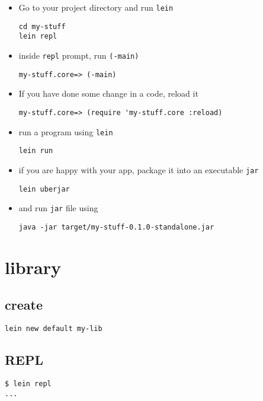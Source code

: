 \documentclass[11pt]{article}
\begin{document}
\begin{itemize}
\item Go to your project directory and run \texttt{lein}

\begin{verbatim}
cd my-stuff
lein repl
\end{verbatim}
\item inside \texttt{repl} prompt, run \texttt{(-main)}

\begin{verbatim}
my-stuff.core=> (-main)
\end{verbatim}
\item If you have done some change in a code, reload it

\begin{verbatim}
my-stuff.core=> (require 'my-stuff.core :reload)
\end{verbatim}
\item run a program using \texttt{lein}

\begin{verbatim}
lein run
\end{verbatim}
\item if you are happy with your app, package it into an executable
      \texttt{jar}

\begin{verbatim}
lein uberjar
\end{verbatim}
\item and run \texttt{jar} file using

\begin{verbatim}
java -jar target/my-stuff-0.1.0-standalone.jar
\end{verbatim}
\end{itemize}
\section{library}
\label{sec-3}
\subsection{create}
\label{sec-3-1}


\begin{verbatim}
lein new default my-lib
\end{verbatim}
\subsection{REPL}
\label{sec-3-2}


\begin{verbatim}
$ lein repl
...
\end{verbatim}
    
\end{document}
